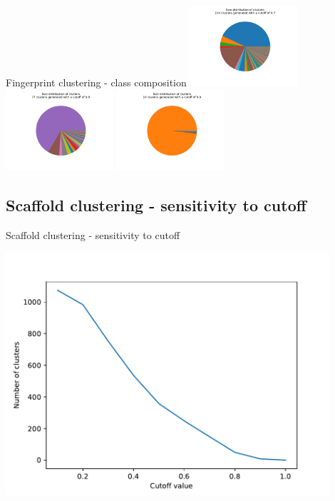 \documentclass{beamer}
\begin{document}
\begin{frame}{Fingerprint clustering - class composition}
\includegraphics[width=0.3\textwidth]{../outputs/fingerprint_clusters_0.7.pdf}
\includegraphics[width=0.3\textwidth]{../outputs/fingerprint_clusters_0.8.pdf}
\includegraphics[width=0.3\textwidth]{../outputs/fingerprint_clusters_0.9.pdf}
    
\end{frame}
    

\subsection{Scaffold clustering - sensitivity to cutoff}
\begin{frame}{Scaffold clustering - sensitivity to cutoff}

\includegraphics[width=0.9\textwidth]{../outputs/scaffold_cluster_cutoffs.pdf}
    
\end{frame}
    
\end{document}
